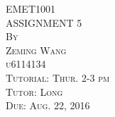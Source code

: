 \documentclass{article}
\begin{document}




\thispagestyle{empty}

\begin{center}
\huge
\vspace*{1.0in} EMET1001 
\\\vspace{0.5in} ASSIGNMENT 5
\normalsize
\\\vspace{0.5in} \textsc{By}
\\\vspace{0.1in} \textsc{Zeming Wang}
\\\vspace{0.1in} \textsc{u6114134}
\normalsize
\\\vspace{0.5in} \textsc{Tutorial: Thur. 2-3 pm}
\\\vspace{0.1in} \textsc{Tutor: Long}
\normalsize
\\\vspace{0.5in} \textsc{Due: Aug. 22, 2016}
\end{center}

\newpage
\setcounter{page}{1}
\end{document}
